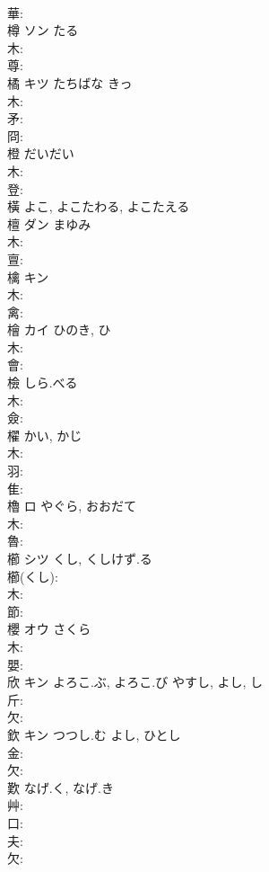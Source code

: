 \documentclass[8pt]{extreport}
\begin{document}
\begin{CJK}{UTF8}{min}
\\	華: 
\\	樽	ソン	たる		
\\	木: 
\\	尊: 
\\	橘	キツ	たちばな	きっ	
\\	木: 
\\	矛: 
\\	冏: 
\\	橙		だいだい				
\\	木: 
\\	登: 
\\	橫		よこ, よこたわる, よこたえる				
\\	檀	ダン	まゆみ		
\\	木: 
\\	亶: 
\\	檎	キン			
\\	木: 
\\	禽: 
\\	檜	カイ	ひのき, ひ		
\\	木: 
\\	會: 
\\	檢		しら.べる				
\\	木: 
\\	僉: 
\\	櫂		かい, かじ				
\\	木: 
\\	羽: 
\\	隹: 
\\	櫓	ロ	やぐら, おおだて		
\\	木: 
\\	魯: 
\\	櫛	シツ	くし, くしけず.る		
\\	櫛(くし): 
\\	木: 
\\	節: 
\\	櫻	オウ	さくら		
\\	木: 
\\	嬰: 
\\	欣	キン	よろこ.ぶ, よろこ.び	やすし, よし, し	
\\	斤: 
\\	欠: 
\\	欽	キン	つつし.む	よし, ひとし	
\\	金: 
\\	欠: 
\\	歎		なげ.く, なげ.き			
\\	艸: 
\\	口: 
\\	夫: 
\\	欠: 

\end{CJK}
\end{document}
